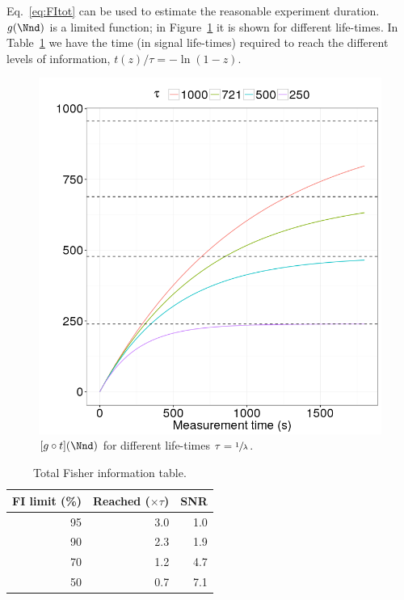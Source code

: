 \documentclass{article}
\begin{document}
Eq.~\eqref{eq:FItot} can be used to estimate the reasonable experiment duration. $g(\Nnd)$ is a limited function; in Figure~\ref{fig:GofT} it is shown for different life-times. In Table~\ref{tbl:FItot} we have the time (in signal life-times) required to reach the different levels of information, $t(z)/\tau = -\ln(1-z)$. 
\begin{figure}[h]
	\centering
	\includegraphics[scale=.5]{img/StatReq/XtotOnTime}
	\caption{$[g\circ t](\Nnd)$ for different life-times $\tau = \sfrac1\lambda$.\label{fig:GofT}}
\end{figure}
\begin{table}[h]
	\centering
	\caption{Total Fisher information table.\label{tbl:FItot}}
	\begin{tabular}{rrr}
		\hline
		FI limit (\%) & Reached ($\times\tau$) & SNR \\ \hline
		           95 &                    3.0 & 1.0 \\
		           90 &                    2.3 & 1.9 \\
		           70 &                    1.2 & 4.7 \\
		           50 &                    0.7 & 7.1 \\ \hline
	\end{tabular}
\end{table}
\end{document}
